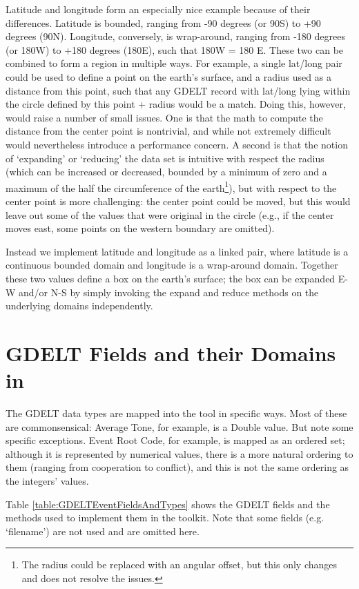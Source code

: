 Latitude and longitude form an especially nice example because of their differences. Latitude is bounded, ranging from -90 degrees (or 90\degree S) to +90 degrees (90\degree N). Longitude, conversely, is wrap-around, ranging from -180 degrees (or 180\degree W)  to +180 degrees (180\degree E), such that 180\degree W = 180 \degree E. These two can be combined to form a region in multiple ways. For example, a single lat/long pair could be used to define a point on the earth's surface, and a radius used as a distance from this point, such that any GDELT record with lat/long lying within the circle defined by this point + radius would be a match. Doing this, however, would raise a number of small issues. One is that the math to compute the distance from the center point is nontrivial, and while not extremely difficult would nevertheless introduce a performance concern. A second is that the notion of `expanding' or `reducing' the data set is intuitive with respect the radius (which can be increased or decreased, bounded by a minimum of zero and a maximum of the half the circumference of the earth\footnote{The radius could be replaced with an angular offset, but this only changes and does not resolve the issues.}), but with respect to the center point is more challenging: the center point could be moved, but this would leave out some of the values that were original in the circle (e.g., if the center moves east, some points on the western boundary are omitted).

Instead we implement latitude and longitude as a linked pair, where latitude is a continuous bounded domain and longitude is a wrap-around domain. Together these two values define a box on the earth's surface; the box can be expanded E-W and/or N-S by simply invoking the expand and reduce methods on the underlying domains independently.

\section{GDELT Fields and their Domains in \gdgas}
The GDELT data types are mapped into the \gdgas tool in specific ways. Most of these are commonsensical: Average Tone, for example, is a Double value. But note some specific exceptions. Event Root Code, for example, is mapped as an ordered set; although it is represented by numerical values, there is a more natural ordering to them (ranging from cooperation to conflict), and this is not the same ordering as the integers' values.

Table \ref{table:GDELTEventFieldsAndTypes} shows the GDELT fields and the methods used to implement them in the \gdgas toolkit. Note that some fields (e.g. `filename') are not used and are omitted here.

